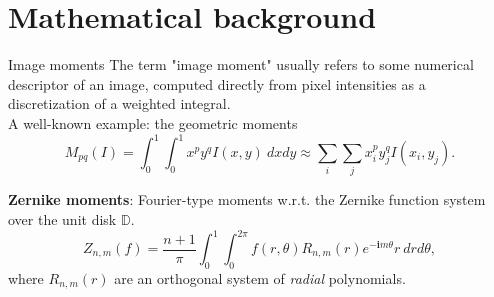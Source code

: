 \documentclass{beamer}
\newcommand{\D}{\mathbb{D}}
\newcommand{\qi}{\textbf{i}}
\def\D{{\mathbb D}}
\begin{document}
{
%
\begin{frame}



\end{frame}
}

\section{Mathematical background}
\begin{frame}{Image moments}
\vskip 3mm
The term "image moment" usually refers to some numerical descriptor of an image, computed directly from pixel intensities as a discretization of a weighted integral.\\
A well-known example: the geometric moments $$M_{pq}(I) = \int_0^1 \int_0^1 x^p y^q I(x,y)\ dx dy \approx
\sum_i \sum_j x_i^p y_j^q I(x_i,y_j).$$

\textbf{Zernike moments}: Fourier-type moments w.r.t. the Zernike function system over the unit disk $\D$.
$$Z_{n,m}(f) = \frac{n+1}{\pi}\int_0^1\int_0^{2\pi}f(r,\theta)R_{n,m}(r)e^{-\qi m\theta} r\ dr d\theta,$$ where $R_{n,m}(r)$ are an orthogonal system of \emph{radial} polynomials.
\end{frame}
\end{document}
